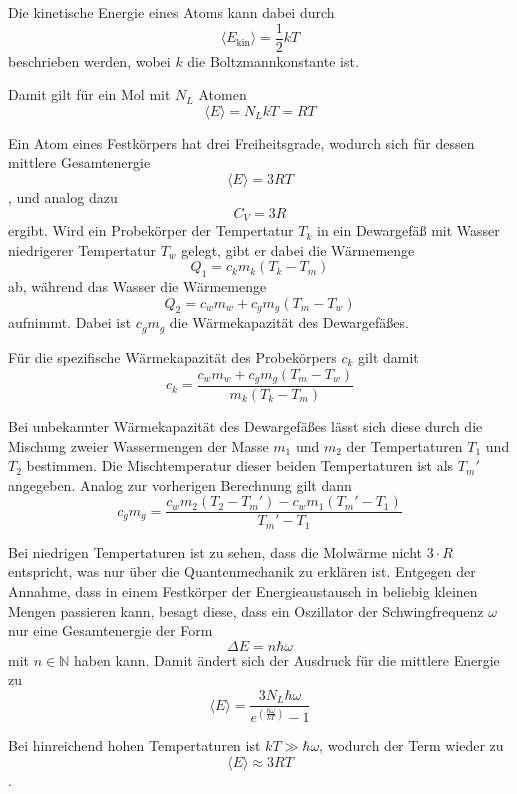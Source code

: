 Die kinetische Energie eines Atoms kann dabei durch 
\begin{equation}
    \langle E_\text{kin} \rangle = \frac{1}2 k T
\end{equation}
beschrieben werden, wobei $k$ die Boltzmannkonstante ist.

Damit gilt für ein Mol mit $N_L$ Atomen 
\begin{equation}
    \langle E \rangle = N_L k T = R T 
\end{equation}

Ein Atom eines Festkörpers hat drei Freiheitsgrade, wodurch sich für dessen mittlere Gesamtenergie 
\begin{equation}
    \langle E \rangle = 3 R T 
\end{equation},
und analog dazu 
\begin{equation}
    C_V = 3 R
\end{equation}
ergibt.
Wird ein Probekörper der Tempertatur $T_k$ in ein Dewargefäß mit Wasser niedrigerer Tempertatur $T_w$ gelegt, gibt er 
dabei die Wärmemenge 
\begin{equation}
    Q_1 = c_k m_k (T_k - T_m)
\end{equation}
ab, während das Wasser die Wärmemenge 
\begin{equation}
    Q_2 = c_w m_w + c_g m_g (T_m - T_w)
\end{equation}
aufnimmt.
Dabei ist $c_g m_g$ die Wärmekapazität des Dewargefäßes.

Für die spezifische Wärmekapazität des Probekörpers $c_k$ gilt damit 
\begin{equation}
    c_k = \frac{c_w m_w + c_g m_g (T_m - T_w)}{m_k (T_k - T_m)}
    \label{eqn:c_k}
\end{equation}

Bei unbekannter Wärmekapazität des Dewargefäßes lässt sich diese durch die Mischung zweier Wassermengen der Masse $m_1$ und $m_2$
der Tempertaturen $T_1$ und $T_2$ bestimmen. Die Mischtemperatur dieser beiden Tempertaturen ist als $T_m'$ angegeben.
Analog zur vorherigen Berechnung gilt dann
\begin{equation}
    c_g m_g = \frac{c_w m_2 (T_2 - T_m') - c_w m_1 (T_m' - T_1)}{T_m' - T_1} 
    \label{eqn:c_g}
\end{equation}

Bei niedrigen Tempertaturen ist zu sehen, dass die Molwärme nicht $3\cdot R$ entspricht, was nur über die Quantenmechanik zu 
erklären ist. Entgegen der Annahme, dass in einem Festkörper der Energieaustausch in beliebig kleinen Mengen passieren kann, besagt
diese, dass ein Oszillator der Schwingfrequenz $\omega$ nur eine Gesamtenergie der Form 
\begin{equation}
    \Delta E = n \hbar \omega 
\end{equation}
mit $n \in \mathds{N}$ haben kann. Damit ändert sich der Ausdruck für die mittlere Energie zu 
\begin{equation}
    \langle E \rangle = \frac{3 N_L \hbar \omega}{e^{(\frac{\hbar \omega}{k T})}-1}
\end{equation}

Bei hinreichend hohen Tempertaturen ist $k T \gg \hbar \omega$, wodurch der Term wieder zu 
\begin{equation}
    \langle E \rangle \approx 3 R T
\end{equation}.



